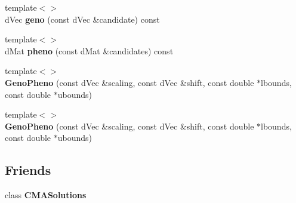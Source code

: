\begin{DoxyCompactItemize}
\item 
\hypertarget{classlibcmaes_1_1GenoPheno_a58481a077a9b020b5b932668c94b41d3}{{\footnotesize template$<$$>$ }\\d\-Vec {\bfseries geno} (const d\-Vec \&candidate) const}\label{classlibcmaes_1_1GenoPheno_a58481a077a9b020b5b932668c94b41d3}

\item 
\hypertarget{classlibcmaes_1_1GenoPheno_a7bea30d3dcae75600b5f30c616c55ef2}{{\footnotesize template$<$$>$ }\\d\-Mat {\bfseries pheno} (const d\-Mat \&candidates) const}\label{classlibcmaes_1_1GenoPheno_a7bea30d3dcae75600b5f30c616c55ef2}

\item 
\hypertarget{classlibcmaes_1_1GenoPheno_adbe3631f81843ff59d935fe7551a954f}{{\footnotesize template$<$$>$ }\\{\bfseries Geno\-Pheno} (const d\-Vec \&scaling, const d\-Vec \&shift, const double $\ast$lbounds, const double $\ast$ubounds)}\label{classlibcmaes_1_1GenoPheno_adbe3631f81843ff59d935fe7551a954f}

\item 
\hypertarget{classlibcmaes_1_1GenoPheno_a290b5770f19f5fe1f70cb60280c8a5b3}{{\footnotesize template$<$$>$ }\\{\bfseries Geno\-Pheno} (const d\-Vec \&scaling, const d\-Vec \&shift, const double $\ast$lbounds, const double $\ast$ubounds)}\label{classlibcmaes_1_1GenoPheno_a290b5770f19f5fe1f70cb60280c8a5b3}

\end{DoxyCompactItemize}
\subsection*{Friends}
\begin{DoxyCompactItemize}
\item 
\hypertarget{classlibcmaes_1_1GenoPheno_a78b1b9910ebce544de9b54b998e77879}{class {\bfseries C\-M\-A\-Solutions}}\label{classlibcmaes_1_1GenoPheno_a78b1b9910ebce544de9b54b998e77879}

\end{DoxyCompactItemize}


